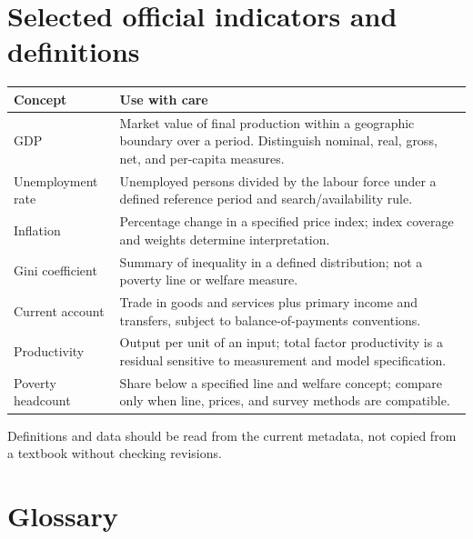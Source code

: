 \documentclass[11pt,oneside,openany]{book}
\begin{document}
\chapter{Selected official indicators and definitions}
\label{app:sources}

\begin{longtable}{p{}p{}}
\toprule
\textbf{Concept} & \textbf{Use with care}\\
\midrule
GDP & Market value of final production within a geographic boundary over a period. Distinguish nominal, real, gross, net, and per-capita measures.\\
Unemployment rate & Unemployed persons divided by the labour force under a defined reference period and search/availability rule.\\
Inflation & Percentage change in a specified price index; index coverage and weights determine interpretation.\\
Gini coefficient & Summary of inequality in a defined distribution; not a poverty line or welfare measure.\\
Current account & Trade in goods and services plus primary income and transfers, subject to balance-of-payments conventions.\\
Productivity & Output per unit of an input; total factor productivity is a residual sensitive to measurement and model specification.\\
Poverty headcount & Share below a specified line and welfare concept; compare only when line, prices, and survey methods are compatible.\\
\bottomrule
\end{longtable}

Definitions and data should be read from the current metadata, not copied from a textbook without checking revisions.

\chapter{Glossary}
\label{app:glossary}
\end{document}
